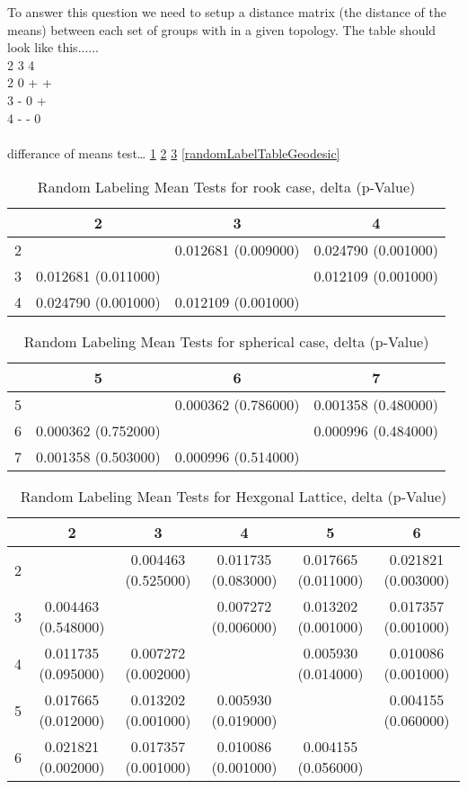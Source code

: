 To answer this question we need to setup a distance matrix (the distance of the
means) between each set of groups with in a given topology.  The table should
look like this...... 
\\
  2 3 4\\
2 0 + +\\
3 - 0 +\\
4 - - 0\\
\\
differance of means test\ldots
\ref{randomLabelTableRook}
\ref{randomLabelTableGraph}
\ref{randomLabelTableHex}
\ref{randomLabelTableGeodesic}

\begin{table}
\centering
\caption{Random Labeling Mean Tests for rook case,  delta (p-Value)}
\label{randomLabelTableRook}
\begin{tabular}{|c||c|c|c|}
\hline
&2&3&4\\
\hline
\hline
2& & 0.012681 (0.009000)& 0.024790 (0.001000)\\
\hline
3& 0.012681 (0.011000)& & 0.012109 (0.001000)\\
\hline
4& 0.024790 (0.001000)& 0.012109 (0.001000)& \\
\hline
\end{tabular} \end{table}


\begin{table}
\centering
\caption{Random Labeling Mean Tests for spherical case,  delta (p-Value)}
\label{randomLabelTableGraph}
\begin{tabular}{|c||c|c|c|}
\hline
&5&6&7\\
\hline
\hline
5& & 0.000362 (0.786000)& 0.001358 (0.480000)\\
\hline
6& 0.000362 (0.752000)& & 0.000996 (0.484000)\\
\hline
7& 0.001358 (0.503000)& 0.000996 (0.514000)& \\
\hline
\end{tabular} \end{table}

\begin{table}
\centering
\caption{Random Labeling Mean Tests for Hexgonal Lattice,  delta (p-Value)}
\label{randomLabelTableHex}
\begin{tabular}{|c||c|c|c|c|c|}
\hline
&2&3&4&5&6\\
\hline
\hline
2& & 0.004463 (0.525000)& 0.011735 (0.083000)& 0.017665 (0.011000)& 0.021821
(0.003000)\\
\hline
3& 0.004463 (0.548000)& & 0.007272 (0.006000)& 0.013202 (0.001000)& 0.017357
(0.001000)\\
\hline
4& 0.011735 (0.095000)& 0.007272 (0.002000)& & 0.005930 (0.014000)& 0.010086
(0.001000)\\
\hline
5& 0.017665 (0.012000)& 0.013202 (0.001000)& 0.005930 (0.019000)& & 0.004155
(0.060000)\\
\hline
6& 0.021821 (0.002000)& 0.017357 (0.001000)& 0.010086 (0.001000)& 0.004155
(0.056000)& \\
\hline
\end{tabular} \end{table}

